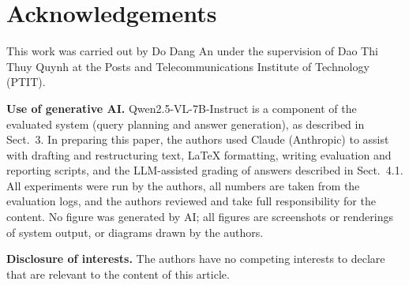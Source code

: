 \documentclass[runningheads]{llncs}
\newif\ifanon
\begin{document}
\section*{Acknowledgements}
\ifanon\else
This work was carried out by Do Dang An under the supervision of Dao Thi Thuy Quynh at the Posts and Telecommunications Institute of Technology (PTIT).

\fi
\textbf{Use of generative AI.} Qwen2.5-VL-7B-Instruct is a component of the evaluated system (query planning and answer generation), as described in Sect.~3. In preparing this paper, the authors used Claude (Anthropic) to assist with drafting and restructuring text, LaTeX formatting, writing evaluation and reporting scripts, and the LLM-assisted grading of answers described in Sect.~4.1. All experiments were run by the authors, all numbers are taken from the evaluation logs, and the authors reviewed and take full responsibility for the content. No figure was generated by AI; all figures are screenshots or renderings of system output, or diagrams drawn by the authors.

\textbf{Disclosure of interests.} The authors have no competing interests to declare that are relevant to the content of this article.



\end{document}
